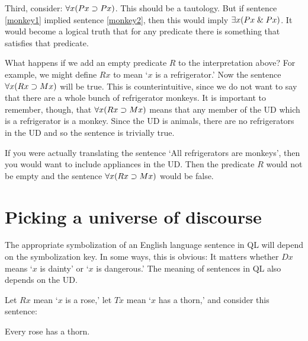 Third, consider: $\forall x (Px \supset Px)$. This should be a tautology. But if sentence \ref{monkey1} implied sentence \ref{monkey2}, then this would imply $\exists x (Px \mathrel\& Px)$. It would become a logical truth that for any predicate there is something that satisfies that predicate.

What happens if we add an empty predicate $R$ to the interpretation above? For example, we might define $Rx$ to mean `$x$ is a refrigerator.' Now the sentence $\forall x(Rx \supset Mx)$ will be true. This is counterintuitive, since we do not want to say that there are a whole bunch of refrigerator monkeys. It is important to remember, though, that $\forall x(Rx \supset Mx)$ means that any member of the UD which is a refrigerator is a monkey. Since the UD is animals, there are no refrigerators in the UD and so the sentence is trivially true.

If you were actually translating the sentence `All refrigerators are monkeys', then you would want to include appliances in the UD. Then the predicate $R$ would not be empty and the sentence $\forall x(Rx \supset Mx)$ would be false.

\begin{table}[t]
\end{table}

\section{Picking a universe of discourse}
The appropriate symbolization of an English language sentence in QL will depend on the symbolization key. In some ways, this is obvious: It matters whether $Dx$ means `$x$ is dainty' or `$x$ is dangerous.' The meaning of sentences in QL also depends on the UD.

Let $Rx$ mean `$x$ is a rose,' let $Tx$ mean `$x$ has a thorn,' and consider this sentence:
\begin{earg}
\item[\ex{pickUDrose}] Every rose has a thorn.
\end{earg}

